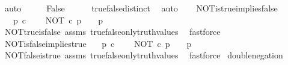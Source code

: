 \begin{isabellebody}
\ auto\isanewline
\ \ \isamarkupfalse%
\ \isamarkupfalse%
\ False\isanewline
\ \ \ \ \isamarkupfalse%
\ true{\isacharunderscore}{\kern0pt}false{\isacharunderscore}{\kern0pt}distinct\ \isamarkupfalse%
\ auto\isanewline
{}\isamarkupfalse%
%
\endisatagproof
{\isafoldproof}%
%
\isadelimproof
\isanewline
%
\endisadelimproof
\ \ \isanewline
{}\isamarkupfalse%
\ NOT{\isacharunderscore}{\kern0pt}is{\isacharunderscore}{\kern0pt}true{\isacharunderscore}{\kern0pt}implies{\isacharunderscore}{\kern0pt}false{\isacharcolon}{\kern0pt}\isanewline
\ \ \ {\isachardoublequoteopen}p\ {\isasymin}\isactrlsub c\ {\isasymOmega}{\isachardoublequoteclose}\isanewline
\ \ \ {\isachardoublequoteopen}NOT\ {\isasymcirc}\isactrlsub c\ p\ {\isacharequal}{\kern0pt}\ {\isasymt}\ {\isasymLongrightarrow}\ p\ {\isacharequal}{\kern0pt}\ {\isasymf}{\isachardoublequoteclose}\isanewline
%
\isadelimproof
\ \ %
\endisadelimproof
%
\isatagproof
{}\isamarkupfalse%
\ NOT{\isacharunderscore}{\kern0pt}true{\isacharunderscore}{\kern0pt}is{\isacharunderscore}{\kern0pt}false\ assms\ true{\isacharunderscore}{\kern0pt}false{\isacharunderscore}{\kern0pt}only{\isacharunderscore}{\kern0pt}truth{\isacharunderscore}{\kern0pt}values\ \isamarkupfalse%
\ fastforce%
\endisatagproof
{\isafoldproof}%
%
\isadelimproof
\isanewline
%
\endisadelimproof
\isanewline
{}\isamarkupfalse%
\ NOT{\isacharunderscore}{\kern0pt}is{\isacharunderscore}{\kern0pt}false{\isacharunderscore}{\kern0pt}implies{\isacharunderscore}{\kern0pt}true{\isacharcolon}{\kern0pt}\isanewline
\ \ \ {\isachardoublequoteopen}p\ {\isasymin}\isactrlsub c\ {\isasymOmega}{\isachardoublequoteclose}\isanewline
\ \ \ {\isachardoublequoteopen}NOT\ {\isasymcirc}\isactrlsub c\ p\ {\isacharequal}{\kern0pt}\ {\isasymf}\ {\isasymLongrightarrow}\ p\ {\isacharequal}{\kern0pt}\ {\isasymt}{\isachardoublequoteclose}\isanewline
%
\isadelimproof
\ \ %
\endisadelimproof
%
\isatagproof
{}\isamarkupfalse%
\ NOT{\isacharunderscore}{\kern0pt}false{\isacharunderscore}{\kern0pt}is{\isacharunderscore}{\kern0pt}true\ assms\ true{\isacharunderscore}{\kern0pt}false{\isacharunderscore}{\kern0pt}only{\isacharunderscore}{\kern0pt}truth{\isacharunderscore}{\kern0pt}values\ \isamarkupfalse%
\ fastforce%
\endisatagproof
{\isafoldproof}%
%
\isadelimproof
\isanewline
%
\endisadelimproof
\isanewline
{}\isamarkupfalse%
\ double{\isacharunderscore}{\kern0pt}negation{\isacharcolon}{\kern0pt}\isanewline

\end{isabellebody}
